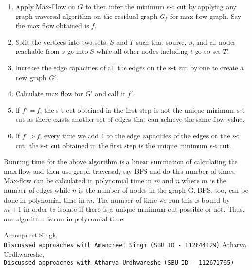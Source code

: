 \documentclass[11pt]{article}
\begin{document}
\begin{enumerate}
	\item Apply Max-Flow on $ G $ to then infer the minimum s-t cut by applying any graph traversal algorithm on the residual graph $ G_f $ for max flow graph. Say the max flow obtained is $ f $.
	\item Split the vertices into two sets, $ S $ and $ T $ such that source, $ s $, and all nodes reachable from $ s $ go into $ S $ while all other nodes including $ t $ go to set $ T $.
	\item Increase the edge capacities of all the edges on the s-t cut by one to create a new graph $ G' $.
	\item Calculate max flow for $ G' $ and call it $ f' $.
	\item If $ f' = f $, the s-t cut obtained in the first step is not the unique minimum s-t cut as there exists another set of edges that can achieve the same flow value.
	\item If $ f' > f $, every time we add 1 to the edge capacities of the edges on the s-t cut, the s-t cut obtained in the first step is the unique minimum s-t cut.
\end{enumerate}

Running time for the above algorithm is a linear summation of calculating the max-flow and then use graph traversal, say BFS and do this number of times. Max-flow can be calculated in polynomial time in $ m $ and $ n $ where $ m $ is the number of edges while $ n $ is the number of nodes in the graph G. BFS, too, can be done in polynomial time in $ m $. The number of time we run this is bound by $ m+1 $ in order to isolate if there is a unique minimum cut possible or not. Thus, our algorithm is run in polynomial time.

\clearpage

\begin{thebibliography}{9}
	Amanpreet Singh,
	\\\texttt{Discussed approaches with Amanpreet Singh (SBU ID - 112044129)}
	Atharva Urdhwareshe,
	\\\texttt{Discussed approaches with Atharva Urdhwareshe (SBU ID - 112671765)}
	
\end{thebibliography}
\end{document}
